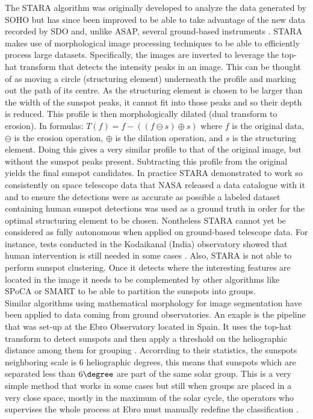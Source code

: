 The STARA algorithm was originally developed to analyze the data generated by SOHO but has since been improved to be able to take advantage of the new data recorded by SDO and, unlike ASAP, several ground-based instruments \cite{ravindra2013digitized}. STARA makes use of morphological image processing techniques \cite{dougherty2003hands} to be able to efficiently process large datasets. Specifically, the images are inverted to leverage the top-hat transform that detects the intensity peaks in an image. This can be thought of as moving a circle (structuring element) underneath the profile and marking out the path of its centre. As the structuring element is chosen to be larger than the width of the sunspot peaks, it cannot fit into those peaks and so their depth is reduced. This profile is then morphologically dilated (dual transform to erosion). In formulas: $T(f) = f - ((f \ominus  s) \oplus  s)$ where $f$ is the original data, $\ominus$ is the erosion operation, $\oplus$ is the dilation operation, and $s$ is the structuring element. Doing this gives a very similar profile to that of the original image, but without the sunspot peaks present. Subtracting this profile from the original yields the final sunspot candidates. In practice STARA demonstrated to work so consistently on space telescope data that NASA released a data catalogue with it and to ensure the detections were as accurate as possible a labeled dataset containing human sunspot detections was used as a ground truth in order for the optimal structuring element to be chosen. Nontheless STARA cannot yet be considered as fully autonomous when applied on ground-based telescope data. For instance, tests conducted in the Kodaikanal (India) observatory showed that human intervention is still needed in some cases \cite{ravindra2013digitized}. Also, STARA is not able to perform sunspot clustering. Once it detects where the interesting features are located in the image it needs to be complemented by other algorithms like SPoCA or SMART to be able to partition the sunspots into groups.\\
Similar algorithms using mathematical morphology for image segmentation have been applied to data coming from ground observatories. An exaple is the pipeline that was set-up at the Ebro Observatory \cite{ebro-observatory} located in Spain. It uses the top-hat transform to detect sunspots and then apply a threshold on the heliographic distance among them for grouping \cite{curto2003automatic}. Accorrding to their statistics, the sunspots neighboring scale is 6 heliographic
degrees, this means that sunspots which are separated less than $6\degree$ are part of the same solar group. This is a very simple method that works in some cases but still when groups are placed in a very close space, mostly in the maximum of the solar cycle, the operators who supervises the whole process at Ebro must manually redefine the classification \cite{curto2003automatic}. \\
